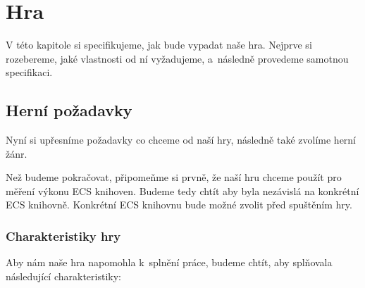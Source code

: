 \chapter{Hra}
V této kapitole si specifikujeme, jak bude vypadat naše hra. Nejprve si rozebereme, jaké vlastnosti od ní vyžadujeme, a~následně provedeme samotnou specifikaci.

\section{Herní požadavky}
Nyní si upřesníme požadavky co chceme od naší hry, následně také zvolíme herní žánr.

Než budeme pokračovat, připomeňme si prvně, že naší hru chceme použít pro měření výkonu ECS knihoven. Budeme tedy chtít aby byla nezávislá na konkrétní ECS knihovně. Konkrétní ECS knihovnu bude možné zvolit před spuštěním hry.

\subsection{Charakteristiky hry}
\label{sec:game-characteristics}
Aby nám naše hra napomohla k~splnění práce, budeme chtít, aby splňovala následující charakteristiky:

